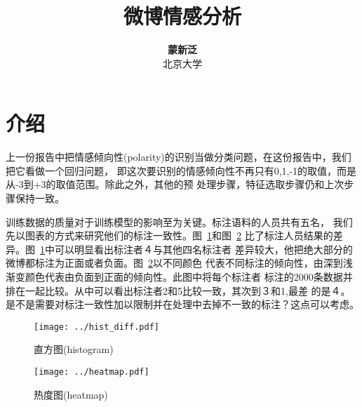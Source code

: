 \documentclass[12pt]{article}
\title{{\bf 微博情感分析}}
\author{ {\bf 蒙新泛}  \\
北京大学\\
}
\begin{document}
\pagestyle{plain}
\maketitle






\section{介绍}
上一份报告中把情感倾向性(polarity)的识别当做分类问题，在这份报告中，我们把它看做一个回归问题，
即这次要识别的情感倾向性不再只有0,1,-1的取值，而是从-3到+3的取值范围。除此之外，其他的预
处理步骤，特征选取步骤仍和上次步骤保持一致。

训练数据的质量对于训练模型的影响至为关键。标注语料的人员共有五名，
我们先以图表的方式来研究他们的标注一致性。图~\ref{fig:diff}和图~\ref{fig:heatmap}
比了标注人员结果的差异。图~\ref{fig:diff}中可以明显看出标注者４与其他四名标注者
差异较大，他把绝大部分的微博都标注为正面或者负面。图~\ref{fig:heatmap}以不同颜色
代表不同标注的倾向性，由深到浅渐变颜色代表由负面到正面的倾向性。此图中将每个标注者
标注的2000条数据并排在一起比较。从中可以看出标注者2和5比较一致，其次到３和1,最差
的是４。是不是需要对标注一致性加以限制并在处理中去掉不一致的标注？这点可以考虑。

\begin{figure}[!htbp]
  \centering
  \texttt{[image: ../hist\_diff.pdf]}
  \caption{直方图(histogram)}
  \label{fig:diff}
\end{figure}

\begin{figure}[!htbp]
  \centering
  \texttt{[image: ../heatmap.pdf]}
  \caption{热度图(heatmap)}
  \label{fig:heatmap}
\end{figure}
\end{document}
